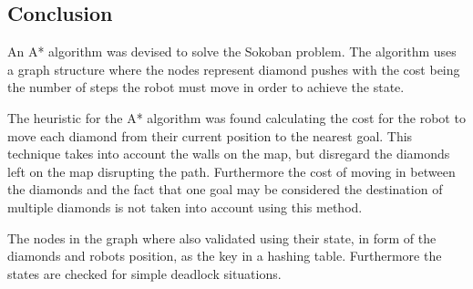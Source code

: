 \subsection{Conclusion}
An A* algorithm was devised to solve the Sokoban problem.
The algorithm uses a graph structure where the nodes represent diamond pushes with the cost being the number of steps the robot must move in order to achieve the state.

The heuristic for the A* algorithm was found calculating the cost for the robot to move each diamond from their current position to the nearest goal.
This technique takes into account the walls on the map, but disregard the diamonds left on the map disrupting the path.
Furthermore the cost of moving in between the diamonds and the fact that one goal may be considered the destination of multiple diamonds is not taken into account using this method.

The nodes in the graph where also validated using their state, in form of the diamonds and robots position, as the key in a hashing table.
Furthermore the states are checked for simple deadlock situations.



